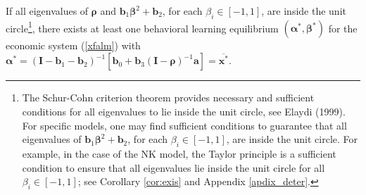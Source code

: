 \begin{prop}
\label{prop:exist} If all eigenvalues of $\pmb\rho$ and ${\pmb b}_1{\pmb\beta}^2+{\pmb b}_2$, for each $\beta_i\in[-1,1]$, are inside the unit circle\footnote{The Schur-Cohn criterion theorem provides necessary and sufficient conditions for all eigenvalues to lie inside the unit circle, see Elaydi (1999). For specific models, one may find sufficient conditions to guarantee that all eigenvalues of ${\pmb b}_1{\pmb\beta}^2+{\pmb b}_2$, for each $\beta_i\in[-1,1]$, are inside the unit circle. For example, in the case of the NK model, the Taylor principle is a sufficient condition to ensure that all eigenvalues lie inside the unit circle for all $\beta_i\in[-1,1]$; see Corollary \ref{cor:exis} and Appendix \ref{apdix_deter}.}, there exists at least one behavioral learning equilibrium $(\pmb\alpha^*,\pmb\beta^*)$ for the economic system (\ref{xfalm})
with $\pmb\alpha^*=({\pmb I}-{\pmb b}_1-{\pmb b}_2)^{-1}[{\pmb b}_0+{\pmb b}_3({\pmb I}-{\pmb\rho})^{-1}{\pmb a}]=\overline{\pmb x^*}$.
\end{prop}





